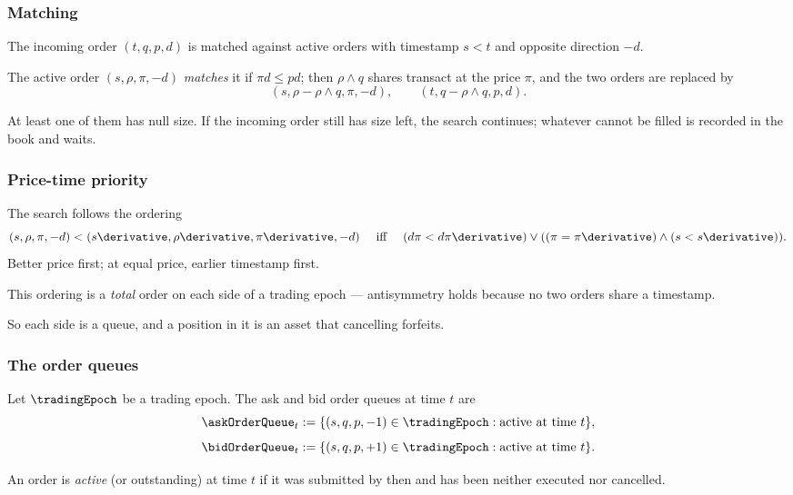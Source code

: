 \begin{frame}
  \frametitle{Matching}
The incoming order $(t,q,p,d)$ is matched against active orders
with timestamp $s<t$ and opposite direction $-d$.

The active order $(s,\rho,\pi,-d)$ \emph{matches} it if $\pi d \leq p d$;
then $\rho \wedge q$ shares transact at the price $\pi$,
and the two orders are replaced by
\[
(s,\rho - \rho\wedge q, \pi, -d),
\qquad
(t,q - \rho\wedge q, p, d).
\]

At least one of them has null size.
If the incoming order still has size left, the search continues;
whatever cannot be filled is recorded in the book and waits.
\end{frame}

\begin{frame}
  \frametitle{Price-time priority}
The search follows the ordering
\[
(s,\rho,\pi,-d)<(s\derivative,\rho\derivative,\pi\derivative,-d)
\quad \text{ iff } \quad
(d\pi<d\pi\derivative)\vee((\pi=\pi\derivative)\wedge(s<s\derivative)).
\]
Better price first; at equal price, earlier timestamp first.

This ordering is a \emph{total} order on each side of a trading epoch ---
antisymmetry holds because no two orders share a timestamp.

So each side is a queue,
and a position in it is an asset that cancelling forfeits.
\end{frame}

\begin{frame}
  \frametitle{The order queues}
\begin{defi}
\label{slide.orderQueue}
Let $\tradingEpoch$ be a trading epoch. The ask and bid order queues at time $t$ are
\[
\askOrderQueue_t := \lbrace (s,q,p,-1)\in \tradingEpoch : \text{active at time } t \rbrace,
\]
\[
\bidOrderQueue_t := \lbrace (s,q,p,+1)\in \tradingEpoch : \text{active at time } t \rbrace.
\]
\end{defi}

An order is \emph{active} (or outstanding) at time $t$ if it was submitted by then
and has been neither executed nor cancelled.
\end{frame}

